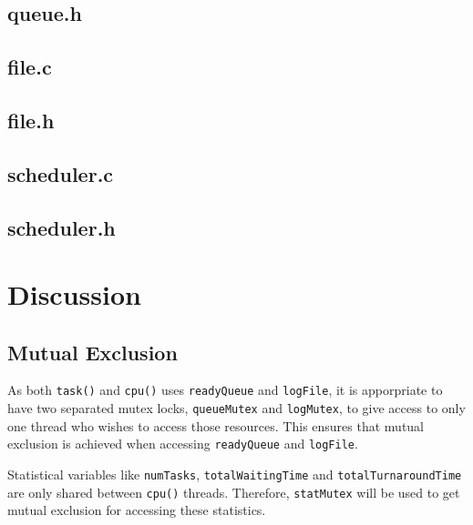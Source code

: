 \documentclass[a4paper, 12pt, titlepage]{article}
\newcommand{\code}[1]{\small\texttt{#1}\normalsize}
\begin{document}
\subsection{queue.h}

\newpage

\subsection{file.c}

\newpage

\subsection{file.h}

\newpage

\subsection{scheduler.c}

\newpage

\subsection{scheduler.h}

\newpage

\section{Discussion}

\subsection{Mutual Exclusion}
As both \code{task()} and \code{cpu()} uses \code{readyQueue} and
\code{logFile}, it is apporpriate to have two separated mutex locks,
\code{queueMutex} and \code{logMutex}, to give access to only one thread
who wishes to access those resources. This ensures that mutual exclusion is
achieved when accessing \code{readyQueue} and \code{logFile}.

Statistical variables like \code{numTasks}, \code{totalWaitingTime} and
\code{totalTurnaroundTime} are only shared between \code{cpu()} threads.
Therefore, \code{statMutex} will be used to get mutual exclusion for
accessing these statistics.
\end{document}

